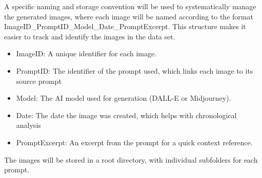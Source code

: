 
A specific naming and storage convention will be used to systematically manage the generated images, where each image will be named according to the format ImageID_PromptID_Model_Date_PromptExcerpt. This structure makes it easier to track and identify the images in the data set.

\begin{itemize}
\item ImageID: A unique identifier for each image.
\item PromptID: The identifier of the prompt used, which links each image to its source prompt
\item Model: The AI model used for generation (DALL-E or Midjourney).
\item Date: The date the image was created, which helps with chronological analysis
\item PromptExcerpt: An excerpt from the prompt for a quick context reference.
\end{itemize}

The images will be stored in a root directory, with individual subfolders for each prompt.